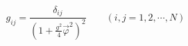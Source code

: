 \begin{equation}
g_{ij}=\frac{\delta_{ij}}{\left(1+\frac{g^2}{4}\vec{\varphi}^2\right)^2}
\qquad (i,j=1,2,\cdots,N)\label{metric}
\end{equation}


